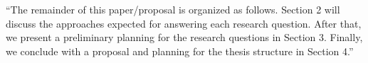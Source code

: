  
``The remainder of this paper/proposal is organized as follows. Section 2 will discuss the approaches expected for answering each research question. After that, we present a preliminary planning for the research questions in Section 3. Finally, we conclude with a proposal and planning for the thesis structure in Section 4.'' 


